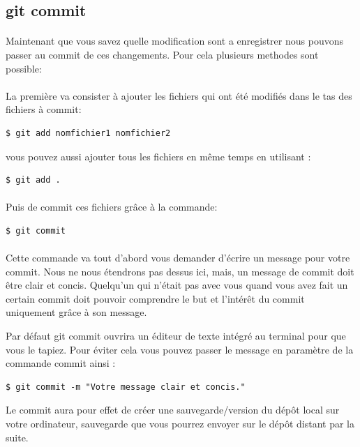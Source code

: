 \documentclass[french, a4paper, 12pt, titlepage]{article}
\begin{document}
\subsection{git commit}
\paragraph{}Maintenant que vous savez quelle modification sont a enregistrer nous pouvons passer au commit de ces changements. Pour cela plusieurs methodes sont possible:

\paragraph{}La première va consister à ajouter les fichiers qui ont été modifiés dans le tas des fichiers à commit:
\begin{lstlisting}
$ git add nomfichier1 nomfichier2
\end{lstlisting}
vous pouvez aussi ajouter tous les fichiers en même temps en utilisant :
\begin{lstlisting}
$ git add .
\end{lstlisting}

\paragraph{}Puis de commit ces fichiers grâce à la commande:
\begin{lstlisting}
$ git commit
\end{lstlisting}
\paragraph{}Cette commande va tout d'abord vous demander d'écrire un message pour votre commit. Nous ne nous étendrons pas dessus ici, mais, un message de commit doit être clair et concis. Quelqu'un qui n'était pas avec vous quand vous avez fait un certain commit doit pouvoir comprendre le but et l'intérêt du commit uniquement grâce à son message.

Par défaut git commit ouvrira un éditeur de texte intégré au terminal pour que vous le tapiez. Pour éviter cela vous pouvez passer le message en paramètre de la commande commit ainsi :
\begin{lstlisting}
$ git commit -m "Votre message clair et concis."
\end{lstlisting}

Le commit aura pour effet de créer une sauvegarde/version du dépôt local sur votre ordinateur, sauvegarde que vous pourrez envoyer sur le dépôt distant par la suite.
\end{document}
